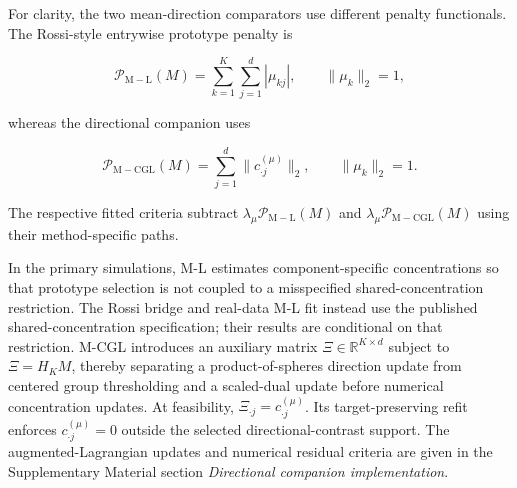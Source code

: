 \documentclass[preprint,12pt,authoryear]{elsarticle}
\begin{document}
\FloatBarrier
\begin{table}[H]
\centering
\small
\caption{Methods, support targets, and roles in the numerical comparisons.}
\label{tab:simulation-methods}
\end{table}

For clarity, the two mean-direction comparators use different penalty
functionals. The Rossi-style entrywise prototype penalty is

\[
\mathcal P_{\mathrm{M-L}}(M)
=\sum_{k=1}^K\sum_{j=1}^d|\mu_{kj}|,
\qquad
\lVert\mu_k\rVert_2=1,
\]

whereas the directional companion uses

\[
\mathcal P_{\mathrm{M-CGL}}(M)
=\sum_{j=1}^d
\lVert c_{\cdot j}^{(\mu)}\rVert_2,
\qquad
\lVert\mu_k\rVert_2=1.
\]

The respective fitted criteria subtract
$\lambda_\mu\mathcal P_{\mathrm{M-L}}(M)$ and
$\lambda_\mu\mathcal P_{\mathrm{M-CGL}}(M)$ using their method-specific
paths.

In the primary simulations, M-L estimates component-specific concentrations so
that prototype selection is not coupled to a misspecified shared-concentration
restriction. The Rossi bridge and real-data M-L fit instead use the published
shared-concentration specification; their results are conditional on that
restriction. M-CGL introduces an auxiliary matrix
$\Xi\in\mathbb R^{K\times d}$ subject to $\Xi=H_KM$, thereby separating a
product-of-spheres direction update from centered group thresholding and a
scaled-dual update before numerical concentration updates. At feasibility,
$\Xi_{\cdot j}=c_{\cdot j}^{(\mu)}$. Its target-preserving refit enforces
$c_{\cdot j}^{(\mu)}=0$ outside the selected
directional-contrast support. The augmented-Lagrangian updates and numerical residual
criteria are given in the Supplementary Material section
\emph{Directional companion implementation}.
\end{document}
